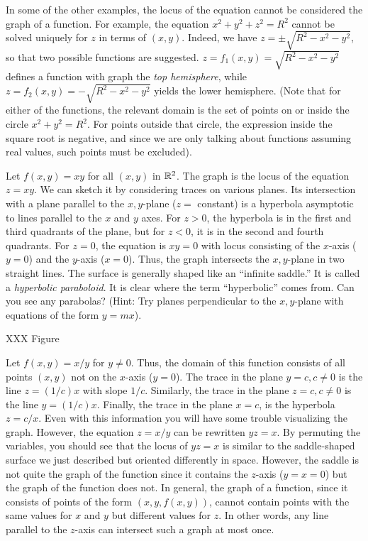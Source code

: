In some of the other examples, the locus
of the equation cannot be considered the graph of a function.
For example, the equation $x^2 + y^2 + z^2 = R^2$ cannot be solved
uniquely for $z$ in terms of $(x,y)$.  Indeed, we have
$z = \pm\sqrt{R^2 - x^2 - y^2}$, so that two possible functions
are suggested.  $z = f_1(x,y) = \sqrt{R^2 - x^2 - y^2}$ 
defines a function with graph
the \emph{top hemisphere}, while $z = f_2(x,y)
= - \sqrt{R^2 - x^2 - y^2}$ yields the lower hemisphere.  (Note that
for either of the functions, the relevant domain is the set of
points on or inside the circle $x^2 + y^2 = R^2$.  For points outside
that circle, the expression inside the square root is negative, and
since we are only talking about functions assuming real values,
such points must be excluded).

\begin{example}
	Let $f(x,y) = xy$ for all $(x,y)$ in $\mathbb{R}^2$.    The graph is the
	locus of the equation $z = xy$.  We can sketch it by considering
	traces on various planes.  Its intersection with a plane parallel
	to the $x,y$-plane ($z =$ constant) is a hyperbola asymptotic to
	lines parallel to the $x$ and $y$ axes.   For $z > 0$, the hyperbola
	is in the first and third quadrants of the plane, but for
	$z < 0$, it is in the second and fourth quadrants.  For $z = 0$,
	the equation is $xy = 0$ with locus consisting of the $x$-axis
	($y = 0$) and the $y$-axis ($x = 0$).   Thus, the graph intersects
	the $x,y$-plane in two straight lines.  The surface is generally
	shaped like an ``infinite saddle.''  It is called a {\it hyperbolic
	paraboloid}.  It is clear where the term ``hyperbolic'' comes from.
	Can you see any parabolas?  (Hint: Try planes perpendicular to
	the $x,y$-plane with equations of the form  $y = mx$).

	XXX Figure
\end{example}

\begin{example}
	 Let $f(x,y) = x/y$ for $y \not= 0$.  Thus, the domain of this
	function consists of all points $(x,y)$ not on the $x$-axis
	($y = 0$).
	The trace in the plane $y = c, c \not= 0$ is the line $z = (1/c)x$
	with slope $1/c$.   Similarly, the trace in the plane $z = c, c \not=0$
	is the line $y = (1/c)x$.  Finally, the trace in the plane $x = c$,
	is the hyperbola $z = c/x$.  Even with this information you will have
	some trouble visualizing the graph.   However, the equation
	$z = x/y$ can be rewritten $yz = x$.   By permuting the variables,
	you should see that the locus of $yz = x$
	 is similar to the  saddle-shaped surface
	we just described but oriented differently in space.  However,
	 the saddle
	is not quite the graph of the function since it  contains the 
	 $z$-axis ($y = x = 0$) but the graph of the function does not.
	In general, the graph of a function, since it consists of points
	of the form $(x,y,f(x,y))$, cannot contain points with the same
	values for $x$ and $y$ but different values for $z$.  In other words,
	any line parallel to the $z$-axis can intersect such a graph at most
	once. 
\end{example}

